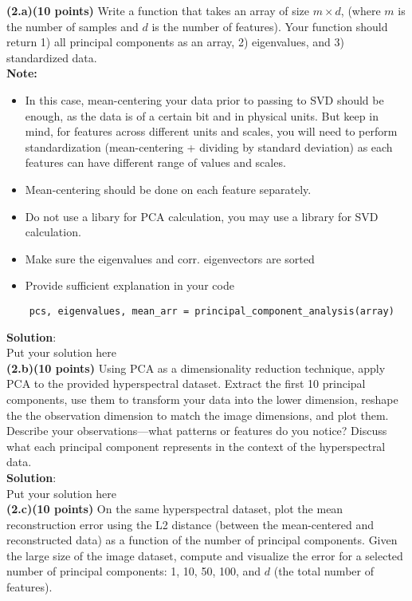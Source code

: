 \documentclass[12pt]{article}
\begin{document}
\noindent\textbf{(2.a)(10 points)} Write a function that takes an array of size \textbf{\(m \times d\)}, (where \(m\) is the number of samples and \(d\) is the number of features). Your function should return 1) all principal components as an array, 2) eigenvalues, and 3) standardized data.\\

\noindent\textbf{Note:} 
\begin{itemize}
    \item In this case, mean-centering your data prior to passing to SVD should be enough, as the data is of a certain bit and in physical units. But keep in mind, for features across different units and scales, you will need to perform standardization (mean-centering + dividing by standard deviation) as each features can have different range of values and scales.
    \item Mean-centering should be done on each feature separately.
    \item Do not use a libary for PCA calculation, you may use a library for SVD calculation.
    \item Make sure the eigenvalues and corr. eigenvectors are sorted
    \item Provide sufficient explanation in your code
\end{itemize}

\begin{verbatim}
    pcs, eigenvalues, mean_arr = principal_component_analysis(array)
\end{verbatim}

\noindent\textbf{Solution}:\\
Put your solution here\\

\noindent\textbf{(2.b)(10 points)} Using PCA as a dimensionality reduction technique, apply PCA to the provided hyperspectral dataset. Extract the first 10 principal components, use them to transform your data into the lower dimension, reshape the the observation dimension to match the image dimensions, and plot them. Describe your observations—what patterns or features do you notice? Discuss what each principal component represents in the context of the hyperspectral data.\\

\noindent\textbf{Solution}:\\
Put your solution here\\

\noindent\textbf{(2.c)(10 points)} On the same hyperspectral dataset, plot the mean reconstruction error using the L2 distance (between the mean-centered and reconstructed data) as a function of the number of principal components. Given the large size of the image dataset, compute and visualize the error for a selected number of principal components: 1, 10, 50, 100, and  \(d \)  (the total number of features).\\
\end{document}
